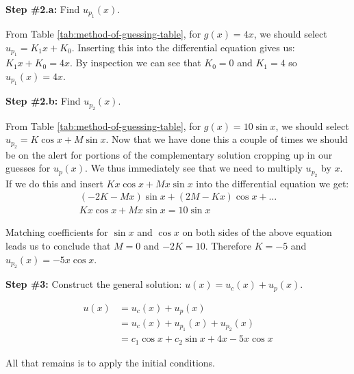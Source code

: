 \noindent\textbf{Step \#2.a:} Find $u_{p_1}(x)$.

\vspace{0.25cm}

\noindent From Table \ref{tab:method-of-guessing-table}, for $g(x)=4x$, we should select $u_{p_1} = K_1x+K_0$.  Inserting this into the differential equation gives us: $K_1x + K_0 = 4x$.  By inspection we can see that $K_0 = 0$ and $K_1 = 4$ so $u_{p_1}(x) = 4x$.  

\vspace{0.25cm}

\noindent\textbf{Step \#2.b: } Find $u_{p_2}(x)$.

\vspace{0.25cm}

\noindent From Table \ref{tab:method-of-guessing-table}, for $g(x)=10\sin{x}$, we should select $u_{p_2} =  K\cos{x}+M\sin{x}$. Now that we have done this a couple of times we should be on the alert for portions of the complementary solution cropping up in our guesses for $u_p(x)$. We thus immediately see that we need to multiply $u_{p_2}$ by $x$.  If we do this and insert $Kx\cos{x}+Mx\sin{x}$ into the differential equation we get:
\begin{multline*}
\left(-2K-Mx\right)\sin{x}+\left(2M-Kx\right)\cos{x} + \dots \\ Kx\cos{x}+Mx\sin{x} = 10\sin{x}
\end{multline*}

\vspace{0.20cm}

\noindent Matching coefficients for $\sin{x}$ and $\cos{x}$ on both sides of the above equation leads us to conclude that $M=0$ and $-2K = 10$.  Therefore $K = -5$ and $u_{p_2}(x)=-5x\cos{x}$.

\vspace{0.20cm}

\noindent\textbf{Step \#3:} Construct the general solution: $u(x)=u_c(x)+u_p(x)$.

\begin{align*}
u(x) &= u_c(x) + u_p(x) \\ 
&= u_c(x) + u_{p_1}(x)+u_{p_2}(x) \\
&= c_1\cos{x}+c_2\sin{x}+4x-5x\cos{x}
\end{align*}

\noindent All that remains is to apply the initial conditions.  

